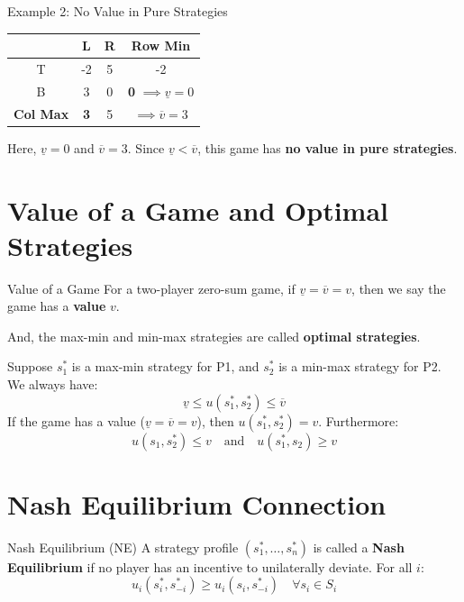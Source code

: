 \documentclass[12pt, a4paper]{article}
\begin{document}
\begin{exbox}{Example 2: No Value in Pure Strategies}
  \begin{center}
  \renewcommand{\arraystretch}{1.3}
  \begin{tabular}{c|cc|c}
    & L & R & \textbf{Row Min} \\
    \hline
    T & -2 & 5 & -2 \\
    B & 3 & 0 & \textbf{\color{defblue} 0} $\implies \underline{v} = 0$ \\
    \hline
    \textbf{Col Max} & \textbf{\color{defblue} 3} & 5 & $\implies \overline{v} = 3$
  \end{tabular}
  \end{center}
  Here, $\underline{v} = 0$ and $\overline{v} = 3$. Since $\underline{v} < \overline{v}$, this game has \textbf{no value in pure strategies}.
\end{exbox}

\section{Value of a Game and Optimal Strategies}

\begin{defbox}{Value of a Game}
  For a two-player zero-sum game, if $\underline{v} = \overline{v} = v$, then we say the game has a \textbf{value} $v$.
  
  And, the max-min and min-max strategies are called \textbf{optimal strategies}.
\end{defbox}

Suppose $s_1^*$ is a max-min strategy for P1, and $s_2^*$ is a min-max strategy for P2.
We always have:
\[
  \underline{v} \leq u(s_1^*, s_2^*) \leq \overline{v}
\]
If the game has a value ($\underline{v} = \overline{v} = v$), then $u(s_1^*, s_2^*) = v$.
Furthermore:
\[
  u(s_1, s_2^*) \leq v \quad \text{and} \quad u(s_1^*, s_2) \geq v
\]

\section{Nash Equilibrium Connection}

\begin{defbox}{Nash Equilibrium (NE)}
  A strategy profile $(s_1^*, \dots, s_n^*)$ is called a \textbf{Nash Equilibrium} if no player has an incentive to unilaterally deviate. For all $i$:
  \[
    u_i(s_i^*, s_{-i}^*) \geq u_i(s_i, s_{-i}^*) \quad \forall s_i \in S_i
  \]
\end{defbox}
\end{document}
